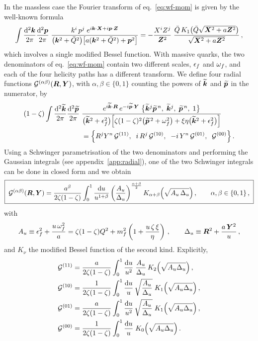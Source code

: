 In the massless case the Fourier transform of eq.~\eqref{eq:wf-mom} is given by the well-known
formula~\cite{Beuf:2017bpd,Iancu:2022gpw}
\begin{equation}
\int\frac{{\rm d}^2\bm{k}}{2\pi}\frac{{\rm d}^2\bm{p}}{2\pi}\;
\frac{k^i\,p^j\;e^{i\bm{k}\cdot\bm{X}+i\bm{p}\cdot\bm{Z}}}{\big(\bm{k}^2+\bar Q^2\big)\big[a(\bm{k}^2+\bar Q^2)+\bm{p}^2\big]}
=-\frac{X^iZ^j}{\bm{Z}^2}\;\frac{\bar Q\,K_1\big(\bar Q\sqrt{\bm{X}^2+a\bm{Z}^2}\big)}{\sqrt{\bm{X}^2+a\bm{Z}^2}}\,,
\label{eq:FT-massless}
\end{equation}
which involves a single modified Bessel function. With massive quarks, the two denominators of
eq.~\eqref{eq:wf-mom} contain two different scales, $\epsilon_f$ and $\omega_f$, and each of the four helicity paths
has a different transform. We define four radial functions $\mathcal{G}^{(\alpha\beta)}(\bm{R},\bm{Y})$, with
$\alpha,\beta\in\{0,1\}$ counting the powers of $\widetilde{\bm{k}}$ and $\widetilde{\bm{p}}$ in the numerator, by
\begin{align}
(1-\zeta)\int\frac{{\rm d}^2\widetilde{\bm{k}}}{2\pi}\frac{{\rm d}^2\widetilde{\bm{p}}}{2\pi}\;&
\frac{e^{i\widetilde{\bm{k}}\cdot\bm{R}}\,e^{-i\widetilde{\bm{p}}\cdot\bm{Y}}\;\big\{\widetilde{\bm{k}}^j\widetilde{\bm{p}}^{\,n},\;\widetilde{\bm{k}}^j,\;\widetilde{\bm{p}}^{\,n},\;1\big\}}
{\big(\widetilde{\bm{k}}^2+\epsilon_f^2\big)\Big[\zeta(1-\zeta)^2\big(\widetilde{\bm{p}}^{\,2}+\omega_f^2\big)+\xi\eta\big(\widetilde{\bm{k}}^2+\epsilon_f^2\big)\Big]}
\nonumber\\
&=\Big\{R^jY^n\,\mathcal{G}^{(11)},\;\;i\,R^j\,\mathcal{G}^{(10)},\;\;-i\,Y^n\,\mathcal{G}^{(01)},\;\;\mathcal{G}^{(00)}\Big\}\,.
\label{eq:Gdef}
\end{align}
Using a Schwinger parametrisation of the two denominators and performing the Gaussian integrals (see
appendix~\ref{app:radial}), one of the two Schwinger integrals can be done in closed form and we obtain
\begin{equation}
\boxed{\;\mathcal{G}^{(\alpha\beta)}(\bm{R},\bm{Y})=\frac{a^\beta}{2\zeta(1-\zeta)}\int_0^1\frac{{\rm d} u}{u^{1+\beta}}
\left(\frac{A_u}{\Delta_u}\right)^{\frac{\alpha+\beta}{2}}K_{\alpha+\beta}\Big(\sqrt{A_u\,\Delta_u}\Big)\,,
\qquad\alpha,\beta\in\{0,1\}\,,\;}
\label{eq:Gab}
\end{equation}
with
\begin{equation}
A_u\equiv\epsilon_f^2+\frac{u\,\omega_f^2}{a}=\zeta(1-\zeta)Q^2+m_f^2\left(1+\frac{u\,\zeta\,\xi}{\eta}\right)\,,\qquad
\Delta_u\equiv\bm{R}^2+\frac{a\,\bm{Y}^2}{u}\,,
\label{eq:ADelta}
\end{equation}
and $K_\nu$ the modified Bessel function of the second kind. Explicitly,
\begin{align}
\mathcal{G}^{(11)}&=\frac{a}{2\zeta(1-\zeta)}\int_0^1\frac{{\rm d} u}{u^2}\;\frac{A_u}{\Delta_u}\,
K_2\Big(\sqrt{A_u\Delta_u}\Big)\,,
\nonumber\\
\mathcal{G}^{(10)}&=\frac{1}{2\zeta(1-\zeta)}\int_0^1\frac{{\rm d} u}{u}\,\sqrt{\frac{A_u}{\Delta_u}}\;
K_1\Big(\sqrt{A_u\Delta_u}\Big)\,,
\nonumber\\
\mathcal{G}^{(01)}&=\frac{a}{2\zeta(1-\zeta)}\int_0^1\frac{{\rm d} u}{u^2}\,\sqrt{\frac{A_u}{\Delta_u}}\;
K_1\Big(\sqrt{A_u\Delta_u}\Big)\,,
\nonumber\\
\mathcal{G}^{(00)}&=\frac{1}{2\zeta(1-\zeta)}\int_0^1\frac{{\rm d} u}{u}\;K_0\Big(\sqrt{A_u\Delta_u}\Big)\,.
\label{eq:Gexplicit}
\end{align}
